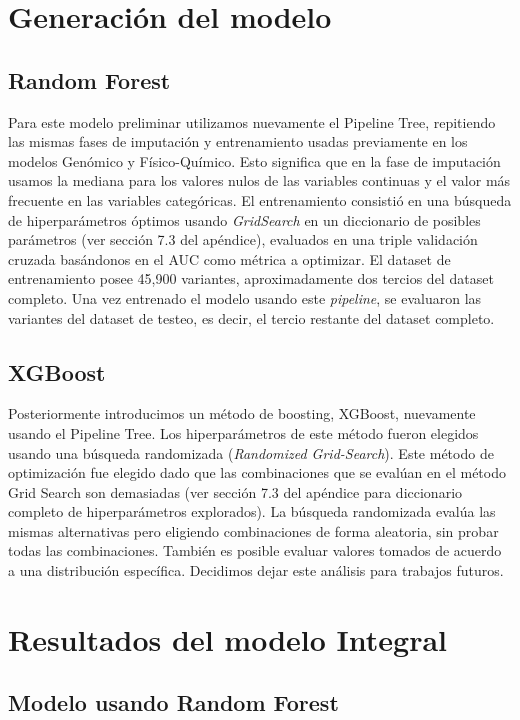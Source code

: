 \section{Generación del modelo}

\subsection{Random Forest}

Para este modelo preliminar utilizamos nuevamente el Pipeline Tree, repitiendo las mismas fases de imputación y entrenamiento usadas previamente en los modelos Genómico y Físico-Químico. Esto significa que en la fase de imputación usamos la mediana para los valores nulos de las variables continuas y el valor más frecuente en las variables categóricas. El entrenamiento consistió en una búsqueda de hiperparámetros óptimos usando \textit{GridSearch} en un diccionario de posibles parámetros (ver sección 7.3 del apéndice), evaluados en una triple validación cruzada basándonos en el AUC como métrica a optimizar. El dataset de entrenamiento posee 45,900 variantes, aproximadamente dos tercios del dataset completo. Una vez entrenado el modelo usando este \textit{pipeline}, se evaluaron las variantes del dataset de testeo, es decir, el tercio restante del dataset completo. 

\subsection{XGBoost}

Posteriormente introducimos un método de boosting, XGBoost, nuevamente usando el Pipeline Tree. Los hiperparámetros de este método fueron elegidos usando una búsqueda randomizada (\textit{Randomized Grid-Search}). Este método de optimización fue elegido dado que las combinaciones que se evalúan en el método Grid Search son demasiadas (ver sección 7.3 del apéndice para diccionario completo de hiperparámetros explorados). La búsqueda randomizada evalúa las mismas alternativas pero eligiendo combinaciones de forma aleatoria, sin probar todas las combinaciones. También es posible evaluar valores tomados de acuerdo a una distribución específica. Decidimos dejar este análisis para trabajos futuros.

\section{Resultados del modelo Integral}

\subsection{Modelo usando Random Forest}

